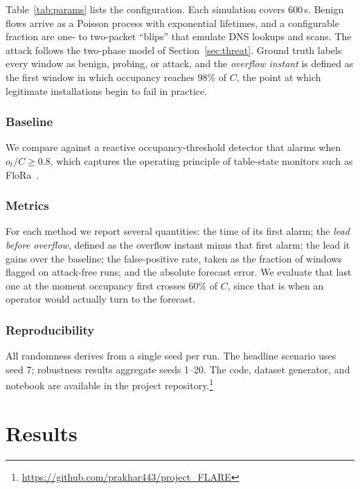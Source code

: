 \documentclass[conference]{IEEEtran}
\begin{document}
Table~\ref{tab:params} lists the configuration. Each simulation covers 600\,s.
Benign flows arrive as a Poisson process with exponential lifetimes, and a
configurable fraction are one- to two-packet ``blips'' that emulate DNS lookups
and scans. The attack follows the two-phase model of
Section~\ref{sec:threat}. Ground truth labels every window as benign, probing,
or attack, and the \emph{overflow instant} is defined as the first window in
which occupancy reaches 98\% of $C$, the point at which legitimate
installations begin to fail in practice.

\subsubsection{Baseline} We compare against a reactive occupancy-threshold
detector that alarms when $o_t / C \ge 0.8$, which captures the operating
principle of table-state monitors such as FloRa~\cite{flora2024}.

\subsubsection{Metrics} For each method we report several quantities: the time of its first alarm; the
\emph{lead before overflow}, defined as the overflow instant minus that first
alarm; the lead it gains over the baseline; the false-positive rate, taken as
the fraction of windows flagged on attack-free runs; and the absolute forecast
error. We evaluate that last one at the moment occupancy first crosses 60\% of
$C$, since that is when an operator would actually turn to the forecast.

\subsubsection{Reproducibility} All randomness derives from a single seed per
run. The headline scenario uses seed 7; robustness results aggregate seeds
1--20. The code, dataset generator, and notebook are available in the project
repository.\footnote{\url{https://github.com/prakhar443/project_FLARE}}

\section{Results}\label{sec:results}
\end{document}
